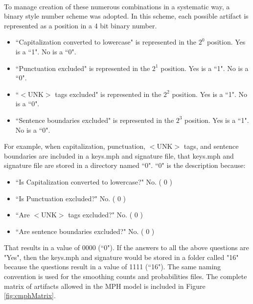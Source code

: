 		\paragraph*{}  To manage creation of these numerous combinations in a systematic way,  a binary style number scheme was adopted. In this scheme, each possible artifact is represented as a position in a 4 bit binary number.  
		\begin{itemize}
			\item ``Capitalization converted to lowercase" is represented in the $2^0$ position. Yes is a ``1".  No is a ``0".
			\item ``Punctuation excluded" is represented in the $2^1$ position. Yes is a ``1".  No is a ``0".
			\item ``$<\text{UNK}>$ tags excluded" is represented in the $2^2$ position. Yes is a ``1".  No is a ``0".
			\item ``Sentence boundaries excluded" is represented in the $2^3$ position. Yes is a ``1".  No is a ``0".
		\end{itemize}
		For example, when capitalization, punctuation, $<\text{UNK}>$ tags, and sentence boundaries are included in a keys.mph and signature file, that keys.mph and signature file are stored in a directory named ``0".  ``0" is the description because:
		\begin{itemize}
			\item ``Is Capitalization converted to lowercase?" No. ( 0 )
			\item ``Is Punctuation excluded?" No. ( 0 )
			\item ``Are $<\text{UNK}>$ tags excluded?" No. ( 0 )
			\item ``Are sentence boundaries excluded?" No. ( 0 )
		\end{itemize}
		That results in a value of 0000 (``0").  If the answers to all the above questions are "Yes", then the keys.mph and signature would be stored in a folder called "16" because the questions result in a value of 1111 (``16").  The same naming convention is used for the smoothing counts and probabilities files.
		 The complete matrix of artifacts allowed in the MPH model is included in Figure \ref{fig:cmphMatrix}.
		
